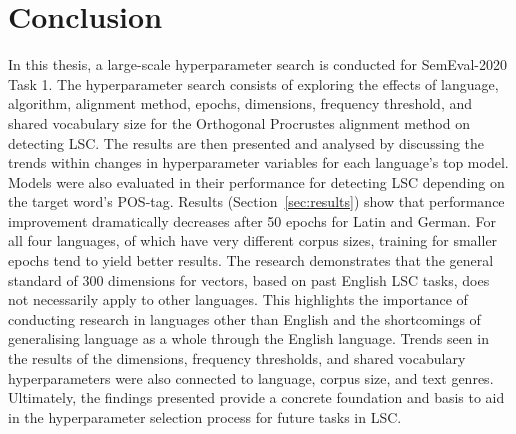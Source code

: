 \section{Conclusion}

In this thesis, a large-scale hyperparameter search is conducted for SemEval-2020 Task 1. The hyperparameter search consists of exploring the effects of language, algorithm, alignment method, epochs, dimensions, frequency threshold, and shared vocabulary size for the Orthogonal Procrustes alignment method on detecting LSC. The results are then presented and analysed by discussing the trends within changes in hyperparameter variables for each language's top model. Models were also evaluated in their performance for detecting LSC depending on the target word's POS-tag. Results (Section~\ref{sec:results}) show that performance improvement dramatically decreases after 50 epochs for Latin and German. For all four languages, of which have very different corpus sizes, training for smaller epochs tend to yield better results. The research demonstrates that the general standard of 300 dimensions for vectors, based on past English LSC tasks, does not necessarily apply to other languages. This highlights the importance of conducting research in languages other than English and the shortcomings of generalising language as a whole through the English language. Trends seen in the results of the dimensions, frequency thresholds, and shared vocabulary hyperparameters were also connected to language, corpus size, and text genres. Ultimately, the findings presented provide a concrete foundation and basis to aid in the hyperparameter selection process for future tasks in LSC.



